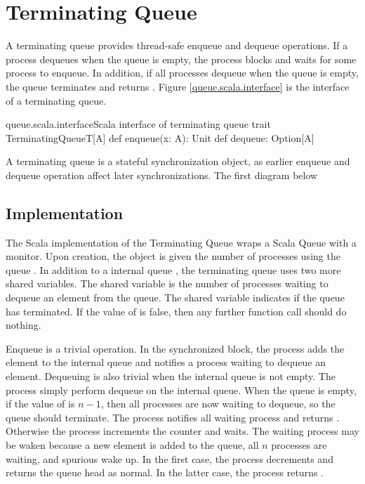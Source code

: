 \documentclass[a4paper, 12pt]{article}
\begin{document}
\section{Terminating Queue}
A terminating queue provides thread-safe enqueue and dequeue operations. If a process dequeues when the queue is empty, the process blocks and waits for some process to enqueue. In addition, if all processes dequeue when the queue is empty, the queue terminates and returns . Figure \ref{queue.scala.interface} is the interface of a terminating queue.

\begin{scalainline}{queue.scala.interface}{Scala interface of terminating queue}
trait TerminatingQueueT[A]{ 
  def enqueue(x: A): Unit
  def dequeue: Option[A] 
}
\end{scalainline}

A terminating queue is a stateful synchronization object, as earlier enqueue and dequeue operation affect later synchronizations. The first diagram below 

\subsection{Implementation}
The Scala implementation of the Terminating Queue wraps a Scala Queue with a monitor. Upon creation, the object is given the number of processes using the queue . In addition to a internal queue , the terminating queue uses two more shared variables. The shared variable  is the number of processes waiting to dequeue an element from the queue. The shared variable  indicates if the queue has terminated. If the value of  is false, then any further function call should do nothing.

Enqueue is a trivial operation. In the synchronized block, the process adds the element to the internal queue and notifies a process waiting to dequeue an element. Dequeuing is also trivial when the internal queue is not empty. The process simply perform dequeue on the internal queue. When the queue is empty, if the value of  is $n-1$, then all processes are now waiting to dequeue, so the queue should terminate. The process notifies all waiting process and returns . Otherwise the process increments the counter  and waits. The waiting process may be waken because a new element is added to the queue, all $n$ processes are waiting, and spurious wake up. In the first case, the process decrements  and returns the queue head as normal. In the latter case, the process returns .
\end{document}
